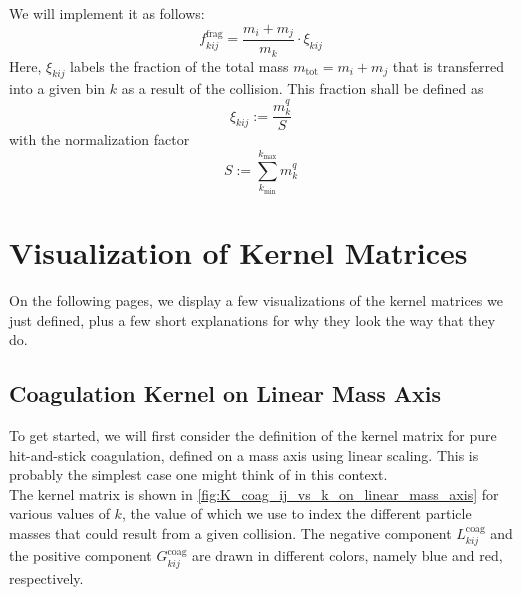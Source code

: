         We will implement it as follows:
        \begin{equation}
            f^\text{frag}_{kij} = \frac{m_i + m_j}{m_k} \cdot \xi_{kij}
        \end{equation}
        Here, $\xi_{kij}$ labels the fraction of the total mass $m_\text{tot} = m_i + m_j$ that 
        is transferred into a given bin $k$ as a result of the collision. 
        This fraction shall be defined as 
        \begin{equation}
            \xi_{kij} := \frac{m_k^q}{S}
        \end{equation}
        with the normalization factor
        \begin{equation}
            S := \sum_{k_\text{min}}^{k_\text{max}} m_k^q %
        \end{equation}



\clearpage\section{Visualization of Kernel Matrices}
    
    On the following pages, we display a few visualizations of the kernel matrices we just 
    defined, plus a few short explanations for why they look the way that they do.

    \subsection{Coagulation Kernel on Linear Mass Axis}
    \label{sec:coagulation_kernel_on_linear_mass_axis}

        To get started, we will first consider the definition of the kernel matrix 
        for pure hit-and-stick coagulation, defined on a mass axis using linear scaling.
        This is probably the simplest case one might think of in this context. \\

        The kernel matrix is shown in \cref{fig:K_coag_ij_vs_k_on_linear_mass_axis} for 
        various values of $k$, the value of which we use to index the different particle 
        masses that could result from a given collision.
        The negative component $L^\text{coag}_{kij}$ and the positive component 
        $G^\text{coag}_{kij}$ are drawn in different colors, namely blue and red, respectively. \\

